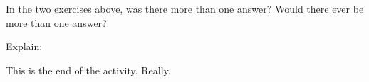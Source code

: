 \documentclass{ximera}
\begin{document}
\begin{exercise}
In the two exercises above, was there more than one answer?  Would there ever be more than one answer? 

\begin{multipleChoice}
\end{multipleChoice}

Explain:

\end{exercise}

This is the end of the activity. Really.
\end{document}
